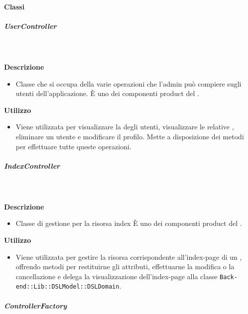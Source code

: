 		\paragraph{Classi}
			\subparagraph{UserController}
				
				\textbf{\\ \\ Descrizione} 
					\begin{itemize}
						\item[] Classe che si occupa della varie operazioni che l'admin può compiere sugli utenti dell'applicazione. È uno dei componenti product del  .
					\end{itemize}      
				\textbf{Utilizzo}  
					\begin{itemize}
						\item[] Viene utilizzata per visualizzare la  degli utenti, visualizzare le relative , eliminare un utente e modificare il profilo. Mette a disposizione dei metodi per effettuare tutte queste operazioni.
					\end{itemize}
			\subparagraph{IndexController}
				
				\textbf{\\ \\ Descrizione} 
					\begin{itemize}
						\item[] Classe di gestione per la risorsa index 
È uno dei componenti product del  .

					\end{itemize}      
				\textbf{Utilizzo}  
					\begin{itemize}
						\item[] Viene utilizzata per gestire la risorsa corrispondente all'index-page di un , offrendo metodi per restituirne gli attributi, effettuarne la modifica o la cancellazione e delega la visualizzazione dell'index-page alla classe \texttt{Back-end::Lib::DSLModel::DSLDomain}.

					\end{itemize}
			\subparagraph{ControllerFactory}
				
